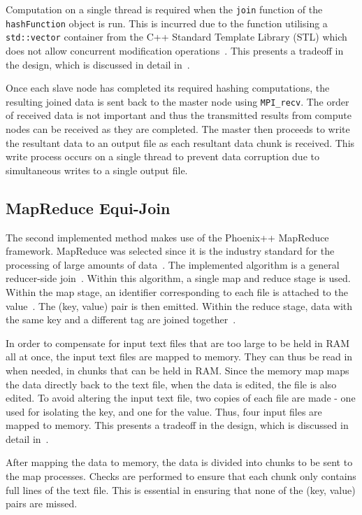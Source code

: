 \documentclass[12pt,twocolumn]{witseiepaper}
\begin{document}
Computation on a single thread is required when the \texttt{join} function of the \texttt{hashFunction} object is run. This is incurred due to the function utilising a \texttt{std::vector} container from the C++ Standard Template Library (STL) which does not allow concurrent modification operations~\cite{stl-vector}. This presents a tradeoff in the design, which is discussed in detail in~.

Once each slave node has completed its required hashing computations, the resulting joined data is sent back to the master node using \texttt{MPI\_recv}. The order of received data is not important and thus the transmitted results from compute nodes can be received as they are completed. The master then proceeds to write the resultant data to an output file as each resultant data chunk is received. This write process occurs on a single thread to prevent data corruption due to simultaneous writes to a single output file.

\subsection{MapReduce Equi-Join}
The second implemented method makes use of the Phoenix++ MapReduce framework. MapReduce was selected since it is the industry standard for the processing of large amounts of data~\cite{comparingMPIMapReduce}. The implemented algorithm is a general reducer-side join~\cite{mapReduceJoin}. Within this algorithm, a single map and reduce stage is used. Within the map stage, an identifier corresponding to each file is attached to the value~\cite{mapReduceJoin}. The (key, value) pair is then emitted. Within the reduce stage, data with the same key and a different tag are joined together~\cite{mapReduceJoin}.

In order to compensate for input text files that are too large to be held in RAM all at once, the input text files are mapped to memory. They can thus be read in when needed, in chunks that can be held in RAM. Since the memory map maps the data directly back to the text file, when the data is edited, the file is also edited. To avoid altering the input text file, two copies of each file are made - one used for isolating the key, and one for the value. Thus, four input files are mapped to memory. This presents a tradeoff in the design, which is discussed in detail in~.

After mapping the data to memory, the data is divided into chunks to be sent to the map processes. Checks are performed to ensure that each chunk only contains full lines of the text file. This is essential in ensuring that none of the (key, value) pairs are missed.
\end{document}
